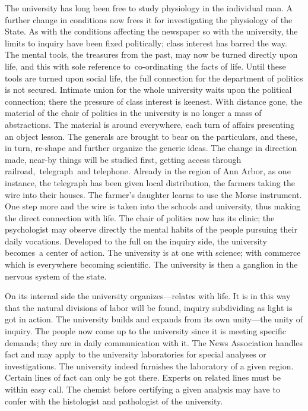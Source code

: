 \documentclass[openany,nobib]{tufte-book}
\begin{document}
The university has long been free to study physiology in the individual
man. A further change in conditions now frees it for investigating the
physiology of the State. As with the conditions affecting the newspaper
so with the university, the limits to inquiry have been fixed
politically; class interest has barred the way. The mental tools, the
treasures from the past, may now be turned directly upon life, and this
with sole reference to~co-ordinating~the facts of life. Until these
tools are turned upon social life, the full connection for the
department of politics is not secured. Intimate union for the whole
university waits upon the political connection; there the pressure of
class interest is keenest. With distance gone, the material of the chair
of politics in the university is no longer a mass of abstractions. The
material is around everywhere, each turn of affairs presenting an object
lesson. The generals are brought to bear on the particulars, and these,
in turn, re-shape and further organize the generic ideas. The change in
direction made, near-by things will be studied first, getting access
through railroad,~telegraph~and telephone. Already in the region of Ann
Arbor, as one instance, the telegraph has been given local distribution,
the farmers taking the wire into their houses. The farmer's daughter
learns to use the Morse instrument. One step more and the wire is taken
into the schools and university, thus making the direct connection with
life. The chair of politics now has its clinic; the psychologist may
observe directly the mental habits of the people pursuing their daily
vocations. Developed to the full on the inquiry side, the university
becomes~a center of action. The university is at one with science; with
commerce which is everywhere becoming scientific. The university is then
a ganglion in the nervous system of the state.~

On its internal side the university organizes---relates with life. It is
in this way that the natural divisions of labor will be found, inquiry
subdividing as light is got in action. The university builds and expands
from its own unity---the unity of inquiry. The people now come up to the
university since it is meeting specific demands; they are in daily
communication with it. The News Association handles fact and may apply
to the university laboratories for special analyses or investigations.
The university indeed furnishes the laboratory of a given region.
Certain lines of fact can only be got there. Experts on related lines
must be within easy call. The chemist before certifying a given analysis
may have to confer with the histologist and pathologist of the
university.~
\end{document}
